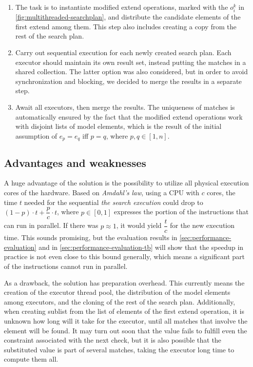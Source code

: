 \begin{enumerate}
	\item The task is to instantiate modified extend operations, marked with the $o^k_i$ in \autoref{fig:multithreaded-searchplan}, and distribute the candidate elements of the first extend among them.  This step also includes creating a copy from the rest of the search plan.
	
	\item Carry out sequential execution for each newly created search plan. Each executor should maintain its own result set, instead putting the matches in a shared collection. The latter option was also considered, but in order to avoid synchronization and blocking, we decided to merge the results in a separate step.
	
	\item Await all executors, then merge the results. The uniqueness of matches is automatically ensured by the fact that the modified extend operations work with disjoint lists of model elements, which is the result of the initial assumption of $e_p = e_q$ iff $p = q$, where $p,q \in [1,n]$.
\end{enumerate}

\subsection{Advantages and weaknesses}
\label{sec:advantages-weaknesses}

A huge advantage of the solution is the possibility to utilize all physical execution cores of the hardware. Based on \emph{Amdahl's law}, using a  CPU with $c$ cores, the time $t$ needed for the sequential \emph{the search execution} could drop to $(1-p) \cdot t + \dfrac{p}{c} \cdot t$, where $p \in [0,1]$ expresses the portion of the instructions that can run in parallel. If there was $ p \approx 1 $, it would yield $\dfrac{t}{c}$ for the new execution time.
This sounds promising, but the evaluation results in  \autoref{sec:performance-evaluation} and in \autoref{sec:performance-evaluation-tb} will show that the speedup in practice is not even close to this bound generally, which means a significant part of the instructions cannot run in parallel.

As a drawback, the solution has preparation overhead. This currently means the creation of the executor thread pool, the distribution of the model elements among executors, and the cloning of the rest of the search plan. Additionally, when creating sublist from the list of elements of the first extend operation, it is unknown how long will it take for the executor, until all matches that involve the element will be found. It may turn out soon that the value fails to fulfill even the constraint associated with the next check, but it is also possible that the substituted value is part of several matches, taking the executor long time to compute them all. 

